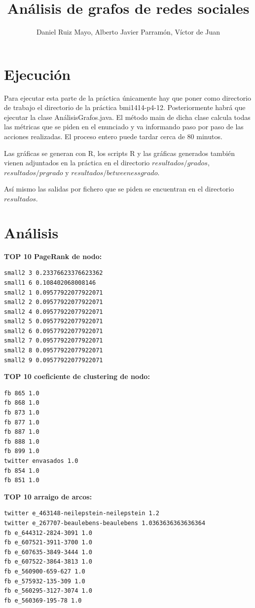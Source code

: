 \documentclass[palatino,nochap]{apuntes}
\title{Análisis de grafos de redes sociales}
\author{Daniel Ruiz Mayo, Alberto Javier Parramón, Víctor de Juan}
\date{}
\begin{document}
\pagestyle{plain}
\maketitle



\section{Ejecución}

Para ejecutar esta parte de la práctica únicamente hay que poner como directorio de trabajo el directorio de la práctica bmi1414-p4-12. Posteriormente habrá que ejecutar la clase AnálisisGrafos.java. El método main de dicha clase calcula todas las métricas que se piden en el enunciado y va informando paso por paso de las acciones realizadas. El proceso entero puede tardar cerca de 80 minutos.

Las gráficas se generan con R, los scripts R y las gráficas generados también vienen adjuntados en la práctica en el directorio $resultados/grados$, $resultados/prgrado$ y $resultados/betweenessgrado$.

Así mismo las salidas por fichero que se piden se encuentran en el directorio $resultados$.


\section{Análisis}

\textbf{TOP 10 PageRank de nodo:}
\begin{verbatim}
small2 3 0.23376623376623362
small1 6 0.108402068008146
small2 1 0.09577922077922071
small2 2 0.09577922077922071
small2 4 0.09577922077922071
small2 5 0.09577922077922071
small2 6 0.09577922077922071
small2 7 0.09577922077922071
small2 8 0.09577922077922071
small2 9 0.09577922077922071
\end{verbatim}


\textbf{TOP 10 coeficiente de clustering de nodo:}
\begin{verbatim}
fb 865 1.0
fb 868 1.0
fb 873 1.0
fb 877 1.0
fb 887 1.0
fb 888 1.0
fb 899 1.0
twitter envasados 1.0
fb 854 1.0
fb 851 1.0
\end{verbatim}


\textbf{TOP 10 arraigo de arcos:}
\begin{verbatim}
twitter e_463148-neilepstein-neilepstein 1.2
twitter e_267707-beaulebens-beaulebens 1.0363636363636364
fb e_644312-2824-3091 1.0
fb e_607521-3911-3700 1.0
fb e_607635-3849-3444 1.0
fb e_607522-3864-3813 1.0
fb e_560900-659-627 1.0
fb e_575932-135-309 1.0
fb e_560295-3127-3074 1.0
fb e_560369-195-78 1.0
\end{verbatim} 
\end{document}
